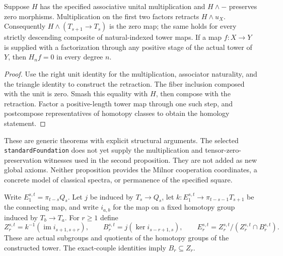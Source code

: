 \begin{proposition}
  \label{prop:h6-tower-homology-zero}
  \leanok
  Suppose $H$ has the specified associative unital multiplication and
  $H\wedge-$ preserves zero morphisms. Multiplication on the first two
  factors retracts $H\wedge u_X$. Consequently $H\wedge(T_{s+1}\to T_s)$
  is the zero map; the same holds for every strictly descending composite
  of natural-indexed tower maps. If a map $f:X\to Y$ is supplied with a
  factorization through any positive stage of the actual tower of $Y$,
  then $H_nf=0$ in every degree $n$.
\end{proposition}
\begin{proof}
  Use the right unit identity for the multiplication, associator naturality,
  and the triangle identity to construct the retraction. The fiber inclusion
  composed with the unit is zero. Smash this equality with $H$, then compose
  with the retraction. Factor a positive-length tower map through one such
  step, and postcompose representatives of homotopy classes to obtain the
  homology statement.
  \leanok
\end{proof}

These are generic theorems with explicit structural arguments. The selected
\texttt{standardFoundation} does not yet supply the multiplication and
tensor-zero-preservation witnesses used in the second proposition. They are
not added as new global axioms. Neither proposition provides the Milnor
cooperation coordinates, a concrete model of classical spectra, or permanence
of the specified square.

\begin{definition}
  \label{def:h6-tower-pages}
  \notready
  Write $E_1^{s,t}=\pi_{t-s}Q_s$.  Let $j$ be induced by $T_s\to Q_s$,
  let $k:E_1^{s,t}\to\pi_{t-s-1}T_{s+1}$ be the connecting map, and
  write $i_{a,b}$ for the map on a fixed homotopy group induced by
  $T_b\to T_a$.  For $r\ge1$ define
  \[
    Z_r^{s,t}=k^{-1}(\operatorname{im}i_{s+1,s+r}),\qquad
    B_r^{s,t}=j(\ker i_{s-r+1,s}),\qquad
    E_r^{s,t}=Z_r^{s,t}/(Z_r^{s,t}\cap B_r^{s,t}).
  \]
  These are actual subgroups and quotients of the homotopy groups of the
  constructed tower.  The exact-couple identities imply $B_r\subseteq Z_r$.
\end{definition}

